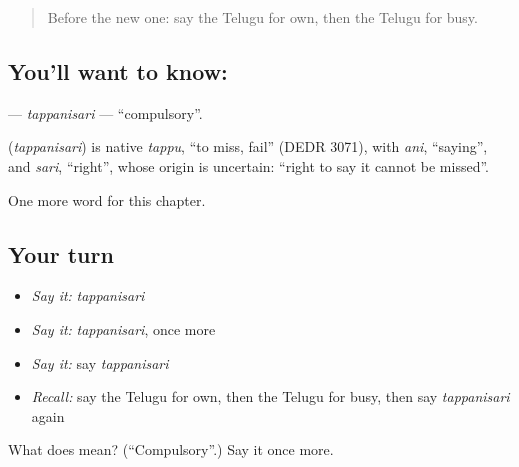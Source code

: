 \label{lesson:TE-C259-tappanisari}



\begin{quote}
Before the new one: say the Telugu for own, then the Telugu for busy.
\end{quote}

\subsection*{You'll want to know: }
\textbf{} — \emph{tappanisari} — \textquotedblleft{}compulsory\textquotedblright{}.

\begin{cousinweb}
\textbf{} (\emph{tappanisari}) is native \emph{tappu}, \textquotedblleft{}to miss, fail\textquotedblright{} (DEDR 3071), with \emph{ani}, \textquotedblleft{}saying\textquotedblright{}, and \emph{sari}, \textquotedblleft{}right\textquotedblright{}, whose origin is uncertain: \textquotedblleft{}right to say it cannot be missed\textquotedblright{}.
\end{cousinweb}

\begin{grammarlens}[title={What you've built}]
One more word for this chapter.
\end{grammarlens}

\subsection*{Your turn}
\begin{itemize}
\raggedright
  \item \emph{Say it:} \emph{tappanisari}
  \item \emph{Say it:} \emph{tappanisari}, once more
  \item \emph{Say it:} say \emph{tappanisari}
  \item \emph{Recall:} say the Telugu for own, then the Telugu for busy, then say \emph{tappanisari} again
\end{itemize}

\begin{tcolorbox}[breakable,colback=teal!4,colframe=teal!35!black,title={Before you move on}]
What does  mean? (\textquotedblleft{}Compulsory\textquotedblright{}.) Say it once more.
\end{tcolorbox}
